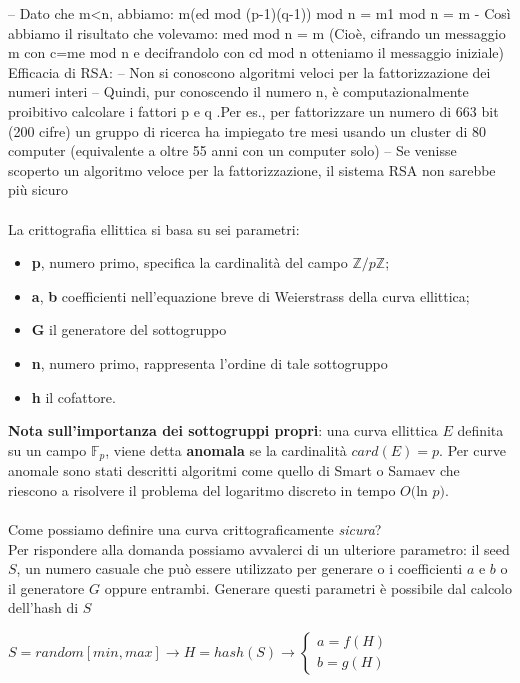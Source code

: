 \documentclass[a4paper,12pt]{tesiinfo}
\begin{document}
– Dato che m<n, abbiamo: m(ed mod (p-1)(q-1)) mod n = m1 mod n = m - Cos\`i abbiamo il risultato che volevamo:
med mod n = m (Cio\`e, cifrando un messaggio m con c=me mod n e decifrandolo con cd mod n otteniamo il messaggio iniziale)
Efficacia di RSA:
– Non si conoscono algoritmi veloci per la fattorizzazione dei numeri interi
– Quindi, pur conoscendo il numero n, \`e computazionalmente  proibitivo calcolare i fattori p e q .Per es., per fattorizzare un numero di 663 bit (200 cifre) un
gruppo di ricerca ha impiegato tre mesi usando un cluster di 80 computer (equivalente a oltre 55 anni con un computer solo) – Se venisse scoperto un algoritmo veloce per la fattorizzazione, il sistema RSA non sarebbe pi\`u sicuro
\\
\\
La crittografia ellittica si basa su sei parametri:
\begin{itemize}
    \item \textbf{p}, numero primo, specifica la cardinalit\`a del campo $\mathbb{Z}/p\mathbb{Z}$;
    \item \textbf{a}, \textbf{b} coefficienti nell'equazione breve di Weierstrass della curva ellittica;
    \item \textbf{G} il generatore del sottogruppo
    \item \textbf{n}, numero primo, rappresenta l'ordine di tale sottogruppo
    \item \textbf{h} il cofattore.
\end{itemize}
\textbf{Nota sull'importanza dei sottogruppi propri}: una curva ellittica $E$ definita su un campo $\mathbb{F}_p$, viene detta \textbf{anomala} se la cardinalit\`a $card(E) = p$. Per curve anomale sono stati descritti algoritmi come quello di Smart o Samaev che riescono a risolvere il problema del logaritmo discreto in tempo $O($ln $p)$.
\\
\\
Come possiamo definire una curva crittograficamente \textit{sicura}?
\\
Per rispondere alla domanda possiamo avvalerci di un ulteriore parametro: il seed $S$, un numero casuale che pu\`o essere utilizzato per generare o i coefficienti $a$ e $b$ o il generatore $G$ oppure entrambi. Generare questi parametri \`e possibile dal calcolo dell'hash di $S$
\begin{center}
    $S = random[min, max] \to H = hash(S) \to 
    \begin{cases}
        a = f(H)\\
        b = g(H)
    \end{cases}$
\end{center}
\end{document}
